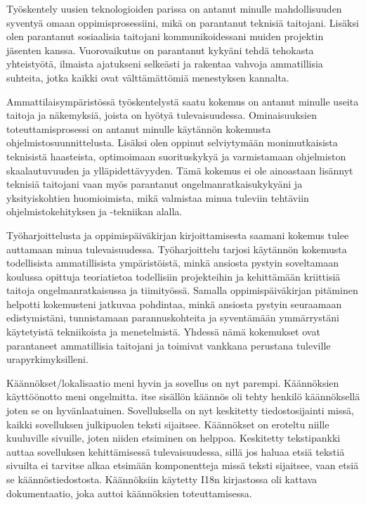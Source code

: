 \documentclass[11pt,a4paper,titlepage,oneside]{article}
\begin{document}
Työskentely uusien teknologioiden parissa on antanut minulle mahdollisuuden syventyä omaan oppimisprosessiini, 
mikä on parantanut teknisiä taitojani.
Lisäksi olen parantanut sosiaalisia taitojani kommunikoidessani muiden projektin jäsenten kanssa.
Vuorovaikutus on parantanut kykyäni tehdä tehokasta yhteistyötä,
ilmaista ajatukseni selkeästi ja rakentaa vahvoja ammatillisia suhteita,
jotka kaikki ovat välttämättömiä menestyksen kannalta. \\
\medskip



Ammattilaisympäristössä työskentelystä saatu kokemus on antanut minulle useita taitoja ja näkemyksiä, 
joista on hyötyä tulevaisuudessa.
Ominaisuuksien toteuttamisprosessi on antanut minulle käytännön kokemusta ohjelmistosuunnittelusta. 
Lisäksi olen oppinut selviytymään monimutkaisista teknisistä haasteista,
optimoimaan suorituskykyä ja varmistamaan ohjelmiston skaalautuvuuden ja ylläpidettävyyden.
Tämä kokemus ei ole ainoastaan lisännyt teknisiä taitojani vaan myös parantanut ongelmanratkaisukykyäni ja yksityiskohtien huomioimista, 
mikä valmistaa minua tuleviin tehtäviin ohjelmistokehityksen ja -tekniikan alalla.

\medskip




%
Työharjoittelusta ja oppimispäiväkirjan kirjoittamisesta saamani kokemus tulee auttamaan minua tulevaisuudessa.
Työharjoittelu tarjosi käytännön kokemusta todellisista ammatillisista ympäristöistä,
minkä ansiosta pystyin soveltamaan koulussa opittuja teoriatietoa todellisiin projekteihin ja kehittämään kriittisiä taitoja 
ongelmanratkaisussa ja tiimityössä.
Samalla oppimispäiväkirjan pitäminen helpotti kokemusteni jatkuvaa pohdintaa,
minkä ansiosta pystyin seuraamaan edistymistäni,
tunnistamaan parannuskohteita ja syventämään ymmärrystäni käytetyistä tekniikoista ja menetelmistä.
Yhdessä nämä kokemukset ovat parantaneet ammatillisia taitojani ja toimivat vankkana perustana tuleville urapyrkimyksilleni.
\medskip













\iffalse

Käännökset/lokalisaatio meni hyvin ja sovellus on nyt parempi.
Käännöksien käyttöönotto meni ongelmitta.
itse sisällön käännös oli tehty henkilö käännöksellä joten se on hyvänlaatuinen.
%
Sovelluksella on nyt keskitetty tiedostosijainti missä, kaikki sovelluksen julkipuolen teksti sijaitsee.
Käännökset on eroteltu niille kuuluville sivuille, joten niiden etsiminen on helppoa.
Keskitetty tekstipankki auttaa sovelluksen kehittämisessä tulevaisuudessa,
sillä jos haluaa etsiä tekstiä sivuilta ei tarvitse alkaa etsimään komponentteja missä teksti sijaitsee,
vaan etsiä se käännöstiedostosta.
%
Käännöksiin käytetty I18n kirjastossa oli kattava dokumentaatio, joka auttoi käännöksien toteuttamisessa.
\medskip
\end{document}
